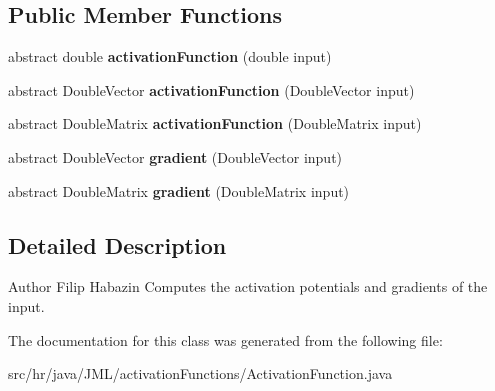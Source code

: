 \subsection*{Public Member Functions}
\begin{DoxyCompactItemize}
\item 
\hypertarget{classhr_1_1java_1_1_j_m_l_1_1activation_functions_1_1_activation_function_a2bb203b04b008c4037748e9d9ff29719}{abstract double {\bfseries activation\+Function} (double input)}\label{classhr_1_1java_1_1_j_m_l_1_1activation_functions_1_1_activation_function_a2bb203b04b008c4037748e9d9ff29719}

\item 
\hypertarget{classhr_1_1java_1_1_j_m_l_1_1activation_functions_1_1_activation_function_a8c0c407aab3e7391d779498465f546f3}{abstract Double\+Vector {\bfseries activation\+Function} (Double\+Vector input)}\label{classhr_1_1java_1_1_j_m_l_1_1activation_functions_1_1_activation_function_a8c0c407aab3e7391d779498465f546f3}

\item 
\hypertarget{classhr_1_1java_1_1_j_m_l_1_1activation_functions_1_1_activation_function_a559bb68c2cf267adc19c4c08842194fd}{abstract Double\+Matrix {\bfseries activation\+Function} (Double\+Matrix input)}\label{classhr_1_1java_1_1_j_m_l_1_1activation_functions_1_1_activation_function_a559bb68c2cf267adc19c4c08842194fd}

\item 
\hypertarget{classhr_1_1java_1_1_j_m_l_1_1activation_functions_1_1_activation_function_afc4943d0df5f84bf26cc7245972f7942}{abstract Double\+Vector {\bfseries gradient} (Double\+Vector input)}\label{classhr_1_1java_1_1_j_m_l_1_1activation_functions_1_1_activation_function_afc4943d0df5f84bf26cc7245972f7942}

\item 
\hypertarget{classhr_1_1java_1_1_j_m_l_1_1activation_functions_1_1_activation_function_a688c4f6390aa1637b2cd35b4b6a14fe8}{abstract Double\+Matrix {\bfseries gradient} (Double\+Matrix input)}\label{classhr_1_1java_1_1_j_m_l_1_1activation_functions_1_1_activation_function_a688c4f6390aa1637b2cd35b4b6a14fe8}

\end{DoxyCompactItemize}


\subsection{Detailed Description}
\begin{DoxyAuthor}{Author}
Filip Habazin Computes the activation potentials and gradients of the input. 
\end{DoxyAuthor}


The documentation for this class was generated from the following file\+:\begin{DoxyCompactItemize}
\item 
src/hr/java/\+J\+M\+L/activation\+Functions/Activation\+Function.\+java\end{DoxyCompactItemize}
